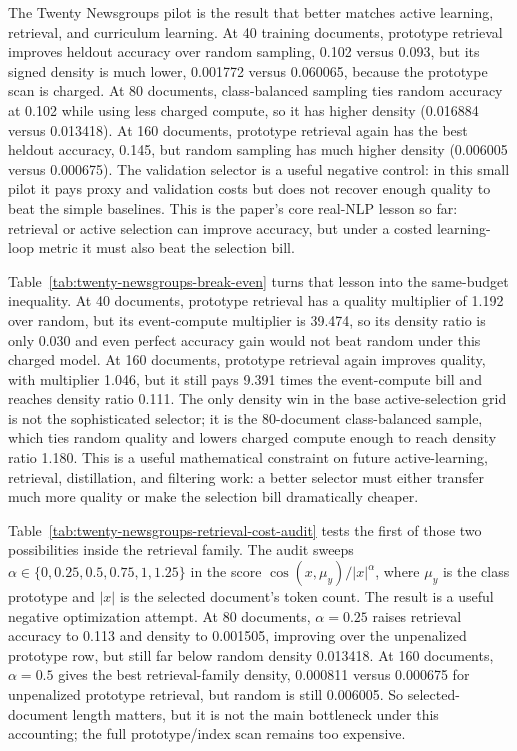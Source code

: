 \documentclass[11pt]{article}
\begin{document}
The Twenty Newsgroups pilot is the result that better matches active learning,
retrieval, and curriculum learning. At 40 training documents, prototype
retrieval improves heldout accuracy over random sampling, 0.102 versus 0.093,
but its signed density is much lower, 0.001772 versus 0.060065, because the
prototype scan is charged. At 80 documents, class-balanced sampling ties random
accuracy at 0.102 while using less charged compute, so it has higher density
(0.016884 versus 0.013418). At 160 documents, prototype retrieval again has the
best heldout accuracy, 0.145, but random sampling has much higher density
(0.006005 versus 0.000675). The validation selector is a useful negative
control: in this small pilot it pays proxy and validation costs but does not
recover enough quality to beat the simple baselines. This is the paper's core
real-NLP lesson so far: retrieval or active selection can improve accuracy, but
under a costed learning-loop metric it must also beat the selection bill.

Table~\ref{tab:twenty-newsgroups-break-even} turns that lesson into the
same-budget inequality. At 40 documents, prototype retrieval has a quality
multiplier of 1.192 over random, but its event-compute multiplier is 39.474, so
its density ratio is only 0.030 and even perfect accuracy gain would not beat
random under this charged model. At 160 documents, prototype retrieval again
improves quality, with multiplier 1.046, but it still pays 9.391 times the
event-compute bill and reaches density ratio 0.111. The only density win in the
base active-selection grid is not the sophisticated selector; it is the
80-document class-balanced sample, which ties random quality and lowers charged
compute enough to reach density ratio 1.180. This is a useful mathematical
constraint on future active-learning, retrieval, distillation, and filtering
work: a better selector must either transfer much more quality or make the
selection bill dramatically cheaper.

Table~\ref{tab:twenty-newsgroups-retrieval-cost-audit} tests the first of those
two possibilities inside the retrieval family. The audit sweeps
\(\alpha \in \{0, 0.25, 0.5, 0.75, 1, 1.25\}\) in the score
\(\cos(x,\mu_y)/|x|^\alpha\), where \(\mu_y\) is the class prototype and
\(|x|\) is the selected document's token count. The result is a useful
negative optimization attempt. At 80 documents, \(\alpha=0.25\) raises
retrieval accuracy to 0.113 and density to 0.001505, improving over the
unpenalized prototype row, but still far below random density 0.013418. At 160
documents, \(\alpha=0.5\) gives the best retrieval-family density, 0.000811
versus 0.000675 for unpenalized prototype retrieval, but random is still
0.006005. So selected-document length matters, but it is not the main bottleneck
under this accounting; the full prototype/index scan remains too expensive.
\end{document}
